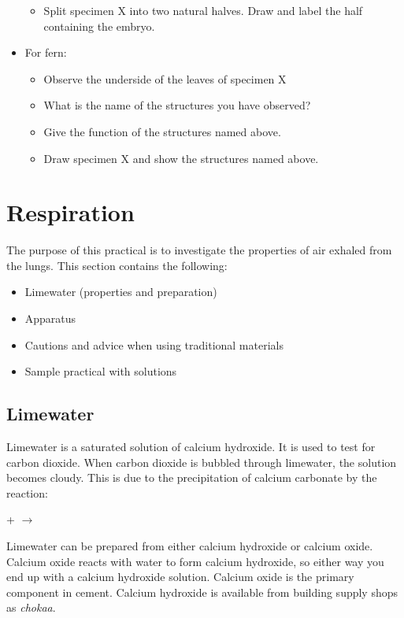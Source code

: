 \begin{itemize}
\begin{itemize}
\item{Split specimen X into two natural halves. Draw and label the half containing the embryo.}
\end{itemize}
\item{For fern:}
\begin{itemize}
\item{Observe the underside of the leaves of specimen X}
\item{What is the name of the structures you have observed?}
\item{Give the function of the structures named above.}
\item{Draw specimen X and show the structures named above.}
\end{itemize}
\end{itemize}
\section{Respiration}  

The purpose of this practical is to investigate the properties of air exhaled from the lungs. This section contains the following:

\begin{itemize}
\item{Limewater (properties and preparation)}
\item{Apparatus}
\item{Cautions and advice when using traditional materials}
\item{Sample practical with solutions}
\end{itemize}

\subsection{Limewater}
Limewater is a saturated solution of calcium hydroxide. It is used to test for carbon dioxide. When carbon dioxide is bubbled through limewater, the solution becomes cloudy. This is due to the precipitation of calcium carbonate by the reaction:

 +  $\longrightarrow$ 

Limewater can be prepared from either calcium hydroxide or calcium oxide. Calcium oxide reacts with water to form calcium hydroxide, so either way you end up with a calcium hydroxide solution. Calcium oxide is the primary component in cement. Calcium hydroxide is available from building supply shops as \textit{chokaa}.

